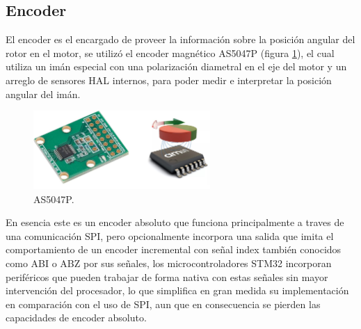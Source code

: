 \documentclass[11pt]{report}
\begin{document}
\newpage
\subsection{Encoder}

El encoder es el encargado de proveer la información sobre la posición angular del rotor en el motor, se utilizó el encoder magnético AS5047P (figura \ref{AS5047P}), el cual utiliza un imán especial con una polarización diametral en el eje del motor y un arreglo de sensores HAL internos, para poder medir e interpretar la posición angular del imán.

\begin{figure}[ht]
	\centering
	\includegraphics[width=0.6\textwidth]{imagenes/Motor/AS5047P.jpg}
	\caption{AS5047P.}
	\label{AS5047P}
\end{figure}
\FloatBarrier

En esencia este es un encoder absoluto que funciona principalmente a traves de una comunicación SPI, pero opcionalmente incorpora una salida que imita el comportamiento de un encoder incremental con señal index también conocidos como ABI o ABZ por sus señales, los microcontroladores STM32 incorporan periféricos que pueden trabajar de forma nativa con estas señales sin mayor intervención del procesador, lo que simplifica en gran medida su implementación en comparación con el uso de SPI, aun que en consecuencia se pierden las capacidades de encoder absoluto.
\end{document}
